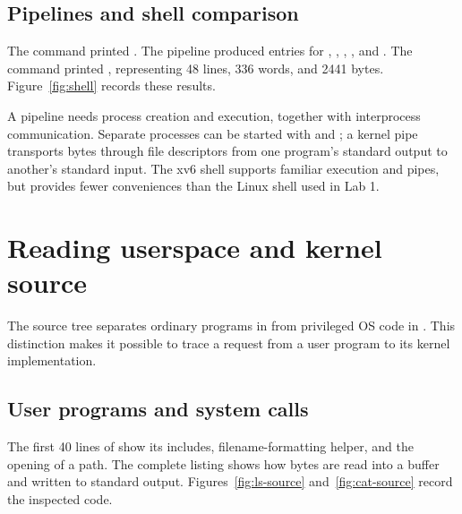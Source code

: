 \documentclass{../latex/utmreport}
\begin{document}
\section{Pipelines and shell comparison}
The command  printed .
The pipeline  produced entries for ,
, , , and .
The command  printed , representing
48 lines, 336 words, and 2441 bytes. Figure~\ref{fig:shell} records these
results.

A pipeline needs process creation and execution, together with interprocess
communication. Separate processes can be started with  and
; a kernel pipe transports bytes through file descriptors from
one program's standard output to another's standard input. The xv6 shell
supports familiar execution and pipes, but provides fewer conveniences than
the Linux shell used in Lab 1.

\chapter{Reading userspace and kernel source}
The source tree separates ordinary programs in  from privileged
OS code in . This distinction makes it possible to trace
a request from a user program to its kernel implementation.

\section{User programs and system calls}
The first 40 lines of  show its includes, filename-formatting
helper, and the opening of a path. The complete  listing
shows how bytes are read into a buffer and written to standard output.
Figures~\ref{fig:ls-source} and~\ref{fig:cat-source} record the inspected code.
\end{document}
